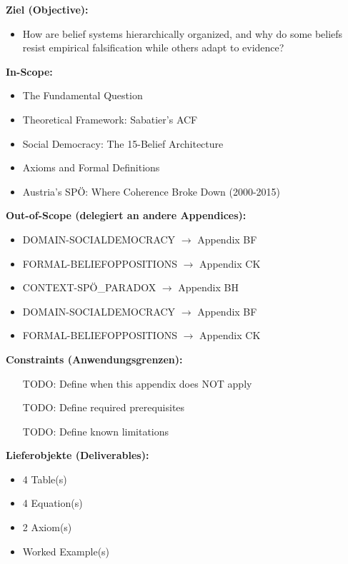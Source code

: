 \begin{tcolorbox}[
    colback=orange!5!white,
    colframe=orange!75!black,
    title={\textbf{Appendix Scope: Ziel / In-Scope / Out-of-Scope / Constraints}},
    fonttitle=\bfseries
]

\textbf{Ziel (Objective):}
\begin{itemize}[nosep]
    \item How are belief systems hierarchically organized, and why do some beliefs resist empirical falsification while others adapt to evidence?
\end{itemize}

\textbf{In-Scope:}
\begin{itemize}[nosep]
    \item The Fundamental Question
    \item Theoretical Framework: Sabatier's ACF
    \item Social Democracy: The 15-Belief Architecture
    \item Axioms and Formal Definitions
    \item Austria's SPÖ: Where Coherence Broke Down (2000-2015)
\end{itemize}

\textbf{Out-of-Scope (delegiert an andere Appendices):}
\begin{itemize}[nosep]
    \item DOMAIN-SOCIALDEMOCRACY $\rightarrow$ Appendix BF
    \item FORMAL-BELIEFOPPOSITIONS $\rightarrow$ Appendix CK
    \item CONTEXT-SPÖ_PARADOX $\rightarrow$ Appendix BH
    \item DOMAIN-SOCIALDEMOCRACY $\rightarrow$ Appendix BF
    \item FORMAL-BELIEFOPPOSITIONS $\rightarrow$ Appendix CK
\end{itemize}

\textbf{Constraints (Anwendungsgrenzen):}
\begin{itemize}[nosep]
    \item [TODO: Define when this appendix does NOT apply]
    \item [TODO: Define required prerequisites]
    \item [TODO: Define known limitations]
\end{itemize}

\textbf{Lieferobjekte (Deliverables):}
\begin{itemize}[nosep]
    \item 4 Table(s)
    \item 4 Equation(s)
    \item 2 Axiom(s)
    \item Worked Example(s)
\end{itemize}

\end{tcolorbox}


